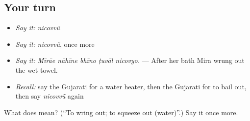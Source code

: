 \subsection*{Your turn}
\begin{itemize}
\raggedright
  \item \emph{Say it:} \emph{nicovvũ}
  \item \emph{Say it:} \emph{nicovvũ}, once more
  \item \emph{Say it:} \emph{Mīrāe nāhīne bhīno ṭuvāl nicovyo.} — After her bath Mira wrung out the wet towel.
  \item \emph{Recall:} say the Gujarati for a water heater, then the Gujarati for to bail out, then say \emph{nicovvũ} again
\end{itemize}

\begin{tcolorbox}[breakable,colback=teal!4,colframe=teal!35!black,title={Before you move on}]
What does  mean? (\textquotedblleft{}To wring out; to squeeze out (water)\textquotedblright{}.) Say it once more.
\end{tcolorbox}
